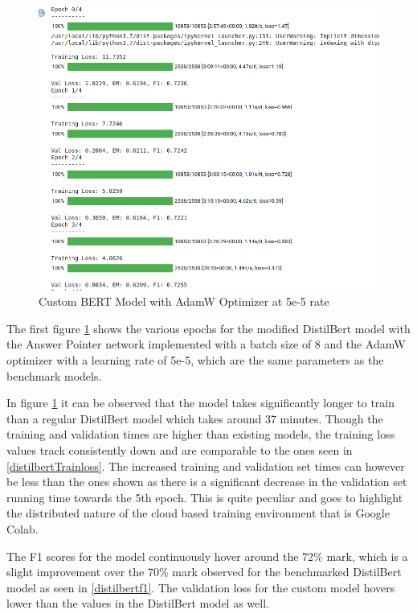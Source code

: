 \documentclass[a4paper,12pt]{report}
\begin{document}
	\begin{figure}[!h]
		\centering
		\includegraphics[scale=0.35]{../images/AdamW5e.png}
		\caption{Custom BERT Model with AdamW Optimizer at 5e-5 rate}\label{adam5e}
	\end{figure}
	
	The first figure \ref{adam5e} shows the various epochs for the modified DistilBert model with the Answer Pointer network implemented with a batch size of 8 and the AdamW optimizer with a learning rate of 5e-5, which  are the same parameters as the benchmark models. 
	
	In figure \ref{adam5e} it can be observed that the model takes significantly longer to train than a regular DistilBert model which takes around 37 minutes. Though the training and validation times are higher than existing models, the training loss values track consistently down and are comparable to the ones seen in \ref{distilbertTrainloss}. The increased training and validation set times can however be less than the ones shown as there is a significant decrease in the validation set running time towards the 5th epoch. This is quite peculiar and goes to highlight the distributed nature of the cloud based training environment that is Google Colab. 
	
	The F1 scores for the model continuously hover around the 72\% mark, which is a slight improvement over the 70\% mark observed for the benchmarked DistilBert model as seen in \ref{distilbertf1}.
	The validation loss for the custom model hovers lower than the values in the DistilBert model as well. 
	
\end{document}
